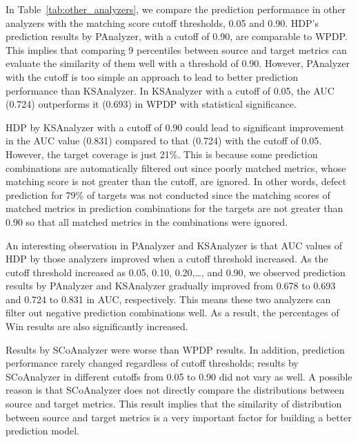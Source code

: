 In Table~\ref{tab:other_analyzers}, we compare the prediction performance in
other analyzers with the matching score cutoff thresholds, 0.05 and 0.90.
HDP's prediction results by PAnalyzer, with a cutoff of 0.90, are
comparable to WPDP. This
implies that comparing 9 percentiles between source and target metrics can
evaluate the similarity of them well with a threshold of 0.90. However,
PAnalyzer with the cutoff is
too simple an approach to lead to better prediction performance than KSAnalyzer. In
KSAnalyzer with a cutoff of 0.05, the AUC (0.724) outperforms it (0.693) in WPDP
with statistical significance.

HDP by KSAnalyzer with a cutoff of 0.90 could lead to significant
improvement in the AUC value (0.831) compared to that (0.724) with the
cutoff of 0.05.
However, the target coverage is just 21\%. This is because some prediction
combinations are automatically filtered out since poorly matched metrics, whose
matching score is not greater than the cutoff, are ignored. In other words,
defect prediction for 79\% of targets was not
conducted since the matching scores of matched metrics in prediction
combinations for the targets are not greater than 0.90 so
that all matched metrics in the combinations were ignored.

An interesting observation in PAnalyzer and KSAnalyzer is that AUC
values of HDP by those analyzers improved when a cutoff threshold
increased. As the cutoff threshold increased as 0.05, 0.10, 0.20,\ldots, and
0.90, we observed prediction results by PAnalyzer and KSAnalyzer
gradually improved from 0.678 to 0.693 and 0.724 to 0.831 in AUC, respectively.
This means these two analyzers can filter out negative prediction combinations
well. As a result, the percentages of Win results are also significantly
increased.

Results by SCoAnalyzer were
worse than WPDP results. In addition,
prediction performance rarely changed regardless of cutoff thresholds; results
by SCoAnalyzer in different cutoffs from 0.05 to 0.90 did not
vary as well.
A possible reason is that SCoAnalyzer does not directly compare
the distributions between source and target metrics.
This result implies that the similarity of distribution between source and
target metrics is a very important factor for building a better
prediction model.


